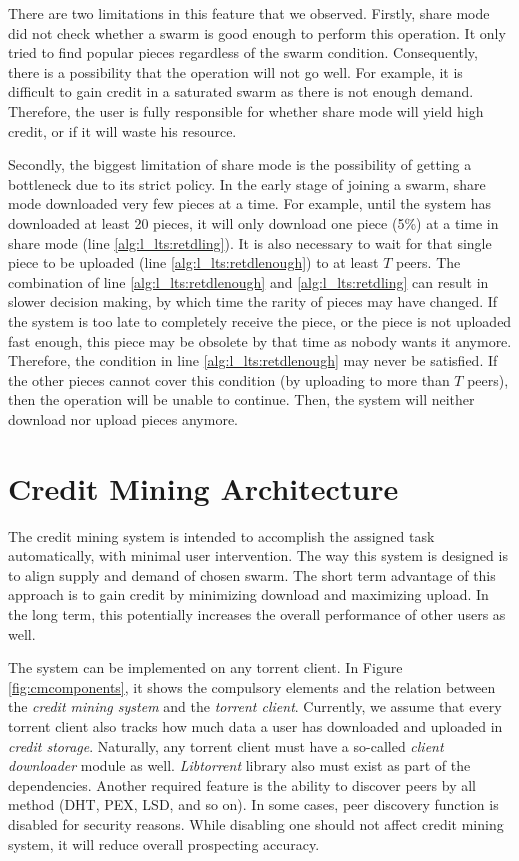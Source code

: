There are two limitations in this feature that we observed. Firstly, share mode did not check whether a swarm is good enough to perform this operation. It only tried to find popular pieces regardless of the swarm condition. Consequently, there is a possibility that the operation will not go well. For example, it is difficult to gain credit in a saturated swarm as there is not enough demand. Therefore, the user is fully responsible for whether share mode will yield high credit, or if it will waste his resource.

Secondly, the biggest limitation of share mode is the possibility of getting a bottleneck due to its strict policy. In the early stage of joining a swarm, share mode downloaded very few pieces at a time. For example, until the system has downloaded at least 20 pieces, it will only download one piece (5\%) at a time in share mode (line \ref{alg:l_lts:retdling}). It is also necessary to wait for that single piece to be uploaded (line \ref{alg:l_lts:retdlenough}) to at least $T$ peers. The combination of line \ref{alg:l_lts:retdlenough} and \ref{alg:l_lts:retdling} can result in slower decision making, by which time the rarity of pieces may have changed. If the system is too late to completely receive the piece, or the piece is not uploaded fast enough, this piece may be obsolete by that time as nobody wants it anymore. Therefore, the condition in line \ref{alg:l_lts:retdlenough} may never be satisfied. If the other pieces cannot cover this condition (by uploading to more than $T$ peers), then the operation will be unable to continue. Then, the system will neither download nor upload pieces anymore.

\section{Credit Mining Architecture}
\label{section:cmcomponents}

The credit mining system is intended to accomplish the assigned task automatically, with minimal user intervention. The way this system is designed is to align supply and demand of chosen swarm. The short term advantage of this approach is to gain credit by minimizing download and maximizing upload. In the long term, this potentially increases the overall performance of other users as well.

The system can be implemented on any torrent client. In Figure \ref{fig:cmcomponents}, it shows the compulsory elements and the relation between the \textit{credit mining system} and the \textit{torrent client}. Currently, we assume that every torrent client also tracks how much data a user has downloaded and uploaded in \textit{credit storage}. Naturally, any torrent client must have a so-called \textit{client downloader} module as well. \textit{Libtorrent} library also must exist as part of the dependencies. Another required feature is the ability to discover peers by all method (DHT, PEX, LSD, and so on). In some cases, peer discovery function is disabled for security reasons. While disabling one should not affect credit mining system, it will reduce overall prospecting accuracy.

